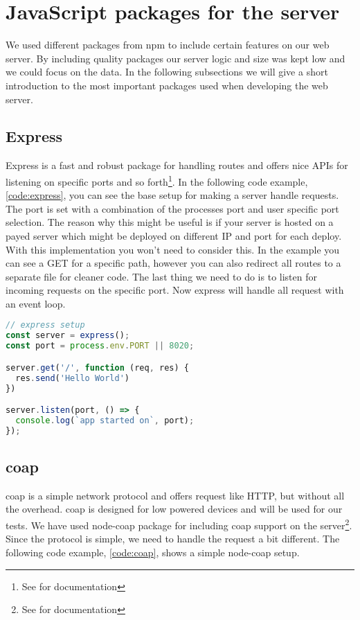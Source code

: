 \documentclass[USenglish]{ifimaster}  %
\begin{document}
\section{JavaScript packages for the server}
We used different packages from \acrshort{npm} to include certain features on our web server. By including quality packages our server logic and size was kept low and we could focus on the data. In the following subsections we will give a short introduction to the most important packages used when developing the web server.

\subsection{Express}
Express is a fast and robust package for handling routes and offers nice APIs for listening on specific ports and so forth\footnote{See \cite{npm:express} for documentation}. In the following code example, \ref{code:express}, you can see the base setup for making a server handle requests. The port is set with a combination of the processes port and user specific port selection. The reason why this might be useful is if your server is hosted on a payed server which might be deployed on different IP and port for each deploy. With this implementation you won't need to consider this. In the example you can see a GET for a specific path, however you can also redirect all routes to a separate file for cleaner code. The last thing we need to do is to listen for incoming requests on the specific port. Now express will handle all request with an event loop.

\begin{lstlisting}[caption={Base express setup},label={code:express},language=JavaScript]
// express setup
const server = express();
const port = process.env.PORT || 8020;

server.get('/', function (req, res) {
  res.send('Hello World')
})

server.listen(port, () => {
  console.log(`app started on`, port);
});
\end{lstlisting}

\subsection{\acrshort{coap}}
\acrfull{coap} is a simple network protocol and offers request like HTTP, but without all the overhead. \acrshort{coap} is designed for low powered devices and will be used for our tests. We have used node-coap package for including \acrshort{coap} support on the server\footnote{See \cite{npm:coap} for documentation}. Since the protocol is simple, we need to handle the request a bit different. The following code example, \vref{code:coap}, shows a simple node-coap setup.
\end{document}
